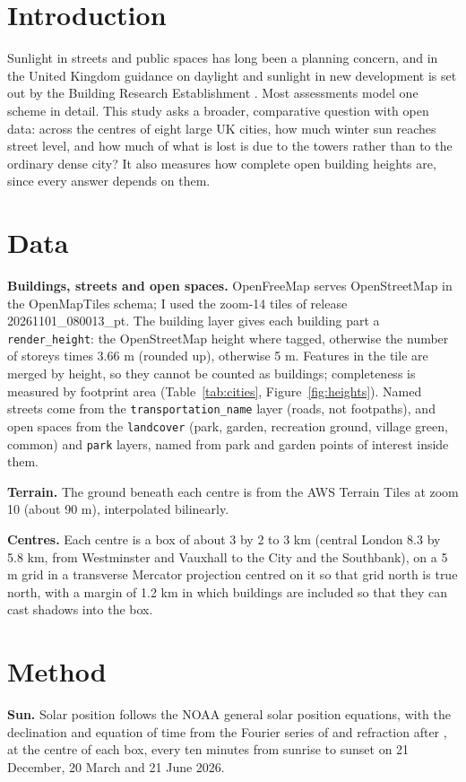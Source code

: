 \documentclass[11pt,a4paper]{article}
\begin{document}
\section{Introduction}
Sunlight in streets and public spaces has long been a planning concern, and in the United Kingdom guidance on daylight and sunlight in new development is set out by the Building Research Establishment \citep{bre2022}. Most assessments model one scheme in detail. This study asks a broader, comparative question with open data: across the centres of eight large UK cities, how much winter sun reaches street level, and how much of what is lost is due to the towers rather than to the ordinary dense city? It also measures how complete open building heights are, since every answer depends on them.

\section{Data}
\textbf{Buildings, streets and open spaces.} OpenFreeMap \citep{openfreemap} serves OpenStreetMap \citep{osm} in the OpenMapTiles schema; I used the zoom-14 tiles of release 20261101\_080013\_pt. The building layer gives each building part a \texttt{render\_height}: the OpenStreetMap height where tagged, otherwise the number of storeys times 3.66 m (rounded up), otherwise 5 m. Features in the tile are merged by height, so they cannot be counted as buildings; completeness is measured by footprint area (Table~\ref{tab:cities}, Figure~\ref{fig:heights}). Named streets come from the \texttt{transportation\_name} layer (roads, not footpaths), and open spaces from the \texttt{landcover} (park, garden, recreation ground, village green, common) and \texttt{park} layers, named from park and garden points of interest inside them.

\textbf{Terrain.} The ground beneath each centre is from the AWS Terrain Tiles at zoom 10 (about 90 m), interpolated bilinearly.

\textbf{Centres.} Each centre is a box of about 3 by 2 to 3 km (central London 8.3 by 5.8 km, from Westminster and Vauxhall to the City and the Southbank), on a 5 m grid in a transverse Mercator projection centred on it so that grid north is true north, with a margin of 1.2 km in which buildings are included so that they can cast shadows into the box.

\section{Method}
\textbf{Sun.} Solar position follows the NOAA general solar position equations, with the declination and equation of time from the Fourier series of \citet{spencer1971} and refraction after \citet{saemundsson1986}, at the centre of each box, every ten minutes from sunrise to sunset on 21 December, 20 March and 21 June 2026.
\end{document}
